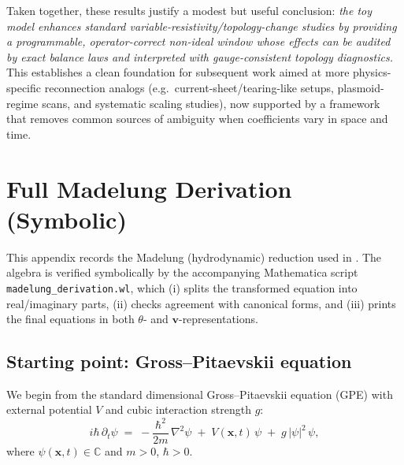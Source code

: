 \documentclass[11pt]{article}
\theoremstyle{plain}
\theoremstyle{definition}
\theoremstyle{remark}
\newcommand{\vfield}{\mathbf{v}}
\begin{document}
Taken together, these results justify a modest but useful conclusion: \emph{the toy model enhances
standard variable-resistivity/topology-change studies by providing a programmable, operator-correct
non-ideal window whose effects can be audited by exact balance laws and interpreted with gauge-consistent
topology diagnostics.} This establishes a clean foundation for subsequent work aimed at more
physics-specific reconnection analogs (e.g.\ current-sheet/tearing-like setups, plasmoid-regime scans,
and systematic scaling studies), now supported by a framework that removes common sources of ambiguity
when coefficients vary in space and time.

\appendix

\section{Full Madelung Derivation (Symbolic)}\label{sec:app_madelung}

This appendix records the Madelung (hydrodynamic) reduction used in . The algebra is
verified symbolically by the accompanying Mathematica script
\texttt{madelung\_derivation.wl}, which (i) splits the transformed equation into real/imaginary parts,
(ii) checks agreement with canonical forms, and (iii) prints the final equations in both $\theta$- and
$\vfield$-representations.

\subsection{Starting point: Gross--Pitaevskii equation}
We begin from the standard dimensional Gross--Pitaevskii equation (GPE) with external potential $V$ and
cubic interaction strength $g$:
\begin{equation}\label{eq:app_gpe}
  i\hbar\,\partial_t\psi
  \;=\;
  -\frac{\hbar^2}{2m}\,\nabla^2\psi
  \;+\;
  V(\mathbf{x},t)\,\psi
  \;+\;
  g\,|\psi|^2\,\psi,
\end{equation}
where $\psi(\mathbf{x},t)\in\mathbb{C}$ and $m>0$, $\hbar>0$.
\end{document}
